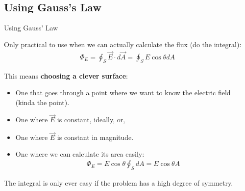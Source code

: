 \documentclass[aspectratio=169,
hyperref={colorlinks,urlcolor=blue}
]{beamer}
\begin{document}
\begin{frame}
\titlepage
\thispagestyle{empty}
\end{frame}

%





\subsection{Using Gauss's Law}
\label{subsec:usinggaussslaw}
\begin{bulletframe}{Using Gauss' Law}
\item Only practical to use when we can actually calculate the flux (do the integral):
\begin{align*}
\Phi_E=\oint_S \vec E \cdot d\vec A=\oint_{S}E\cos\theta dA 
\end{align*}
\item This means \textbf{choosing a clever surface}:
\begin{itemize}
\item One that goes through a point where we want to know the electric field (kinda the point).
\item One where $\vec E$ is constant, ideally, or, 
\item One where $\vec E$ is constant in magnitude.
\item One where we can calculate its area easily:
\begin{align*}
\Phi_E=E\cos\theta \oint_S dA =E\cos\theta A
\end{align*}
\end{itemize}
\item The integral is only ever easy if the problem has a high degree of symmetry.
\end{bulletframe}


\end{document}
